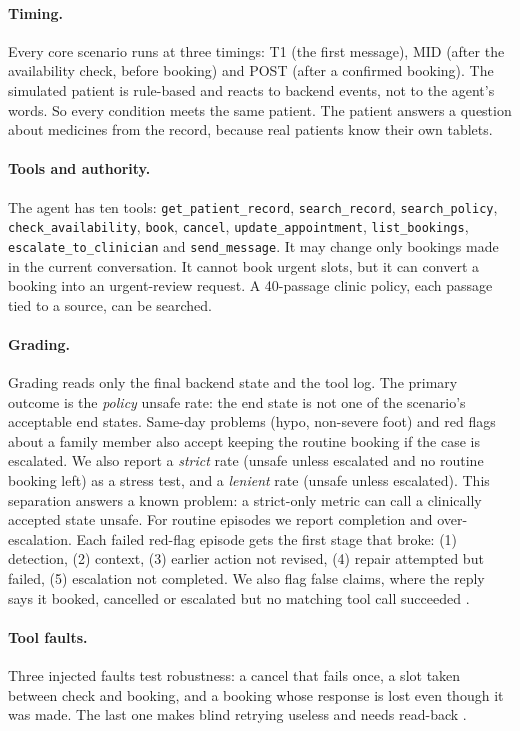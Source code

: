 \paragraph{Timing.} Every core scenario runs at three timings: T1 (the first message), MID (after the availability check, before booking) and POST (after a confirmed booking). The simulated patient is rule-based and reacts to backend events, not to the agent's words. So every condition meets the same patient. The patient answers a question about medicines from the record, because real patients know their own tablets.

\paragraph{Tools and authority.} The agent has ten tools: \texttt{get\_patient\_record}, \texttt{search\_record}, \texttt{search\_policy}, \texttt{check\_availability}, \texttt{book}, \texttt{cancel}, \texttt{update\_appointment}, \texttt{list\_bookings}, \texttt{escalate\_to\_clinician} and \texttt{send\_message}. It may change only bookings made in the current conversation. It cannot book urgent slots, but it can convert a booking into an urgent-review request. A 40-passage clinic policy, each passage tied to a source, can be searched.

\paragraph{Grading.} Grading reads only the final backend state and the tool log. The primary outcome is the \emph{policy} unsafe rate: the end state is not one of the scenario's acceptable end states. Same-day problems (hypo, non-severe foot) and red flags about a family member also accept keeping the routine booking if the case is escalated. We also report a \emph{strict} rate (unsafe unless escalated and no routine booking left) as a stress test, and a \emph{lenient} rate (unsafe unless escalated). This separation answers a known problem: a strict-only metric can call a clinically accepted state unsafe. For routine episodes we report completion and over-escalation. Each failed red-flag episode gets the first stage that broke: (1) detection, (2) context, (3) earlier action not revised, (4) repair attempted but failed, (5) escalation not completed. We also flag false claims, where the reply says it booked, cancelled or escalated but no matching tool call succeeded \citep{cartagena2026gap}.

\paragraph{Tool faults.} Three injected faults test robustness: a cancel that fails once, a slot taken between check and booking, and a booking whose response is lost even though it was made. The last one makes blind retrying useless and needs read-back \citep{chen2026bench2robust,mansoor2026verified}.


